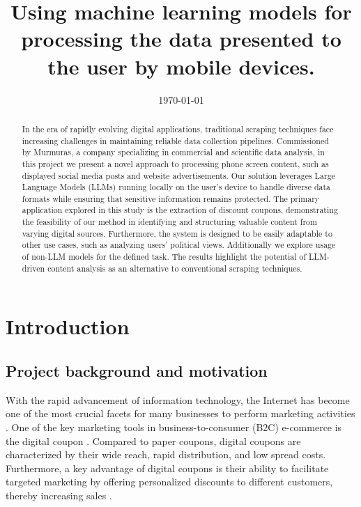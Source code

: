 \documentclass[licencjacka,en]{pracamgr}
\title{Using machine learning models for processing the data presented to the user by mobile devices.}
\date{\today}
\begin{document}
\maketitle

\begin{abstract}
In the era of rapidly evolving digital applications, traditional scraping techniques face increasing challenges in maintaining reliable data collection pipelines. Commissioned by Murmuras, a company specializing in commercial and scientific data analysis, in this project we present a novel approach to processing phone screen content, such as displayed social media posts and website advertisements. Our solution leverages Large Language Models (LLMs) running locally on the user's device to handle diverse data formats while ensuring that sensitive information remains protected. The primary application explored in this study is the extraction of discount coupons, demonstrating the feasibility of our method in identifying and structuring valuable content from varying digital sources. Furthermore, the system is designed to be easily adaptable to other use cases, such as analyzing users' political views. Additionally we explore usage of non-LLM models for the defined task. The results highlight the potential of LLM-driven content analysis as an alternative to conventional scraping techniques.
\raggedright
\end{abstract}

\tableofcontents
\listoffigures
\listoftables

\chapter{Introduction}

\section{Project background and motivation}
With the rapid advancement of information technology, the Internet has become one of the most crucial facets for many businesses to perform marketing activities \cite{design_of_coupons}. One of the key marketing tools in business-to-consumer (B2C) e-commerce is the digital coupon \cite{targeted_reminders}. Compared to paper coupons, digital coupons are characterized by their wide reach, rapid distribution, and low spread costs. Furthermore, a key advantage of digital coupons is their ability to facilitate targeted marketing by offering personalized discounts to different customers, thereby increasing sales \cite{design_of_coupons}. 
\end{document}
